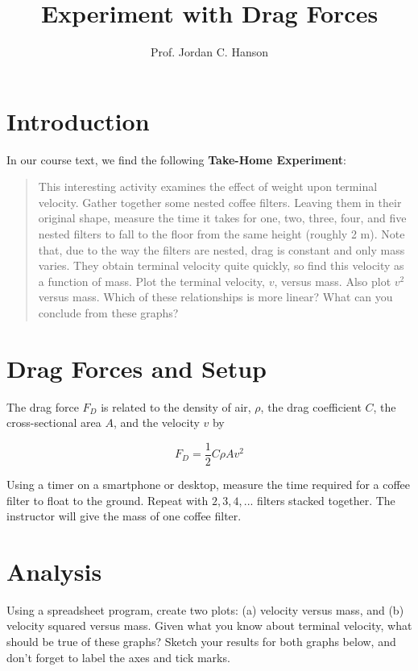 \documentclass{article}
\begin{document}
\title{Experiment with Drag Forces}
\author{Prof. Jordan C. Hanson}

\maketitle

\section{Introduction}

In our course text, we find the following \textbf{Take-Home Experiment}:

\begin{quote}
This interesting activity examines the effect of weight upon terminal velocity. Gather together some nested coffee filters. Leaving them in their original shape, measure the time it takes for one, two, three, four, and five nested filters to fall to the floor from the same height (roughly 2 m).  Note that, due to the way the filters are nested, drag is constant and only mass varies. They obtain terminal velocity quite quickly, so find this velocity as a function of mass.  Plot the terminal velocity, $v$, versus mass. Also plot $v^2$ versus mass.  Which of these relationships is more linear? What can you conclude from these graphs?
\end{quote}

\section{Drag Forces and Setup}

The drag force $F_D$ is related to the density of air, $\rho$, the drag coefficient $C$, the cross-sectional area $A$, and the velocity $v$ by

\begin{equation}
F_D = \frac{1}{2}C\rho A v^2
\end{equation}

Using a timer on a smartphone or desktop, measure the time required for a coffee filter to float to the ground.  Repeat with $2, 3, 4, ... $ filters stacked together.  The instructor will give the mass of one coffee filter.

\section{Analysis}

Using a spreadsheet program, create two plots: (a) velocity versus mass, and (b) velocity squared versus mass.  Given what you know about terminal velocity, what should be true of these graphs?  Sketch your results for both graphs below, and don't forget to label the axes and tick marks.
\end{document}
